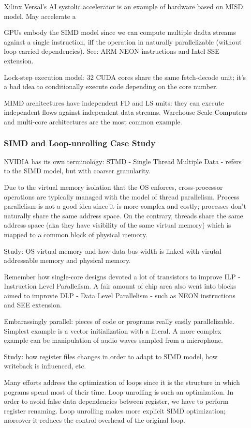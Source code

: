Xilinx Versal's AI systolic accelerator is an example of hardware based on MISD model. May accelerate a 

GPUs embody the SIMD model since we can compute multiple dadta streams against a single instruction, iff the operation in naturally parallelizable (without loop carried dependencies).
See: ARM NEON instructions and Intel SSE extension.

Lock-step execution model: 32 CUDA cores share the same fetch-decode unit; it's a bad idea to conditionally execute code depending on the core number.

MIMD architectures have independent FD and LS units: they can execute independent flows against independent data streams. Warehouse Scale Computers and multi-core architectures are the most common example.

\subsubsection{SIMD and Loop-unrolling Case Study}
NVIDIA has its own terminology: STMD - Single Thread Multiple Data - refers to the SIMD model, but with coarser granularity.

Due to the virtual memory isolation that the OS enforces, cross-processor operations are typically managed with the model of thread parallelism.
Process parallelism is not a good idea since it is more complex and costly; processes don't naturally share the same address space.
On the contrary, threads share the same address space (aka they have visibility of the same virtual memory) which is mapped to a common block of physical memory.

Study: OS virtual memory and how data bus width is linked with virutal addressable memory and physical memory.

Remember how single-core designs devoted a lot of transistors to improve ILP - Instruction Level Parallelism.
A fair amount of chip area also went into blocks aimed to improvie DLP - Data Level Parallelism - such as NEON instructions and SEE extension.

Embarassingly parallel: pieces of code or programs really easily parallelizable. Simplest example is a vector initialization with a literal.
A more complex example can be manipulation of audio waves sampled from a microphone.

Study: how register files changes in order to adapt to SIMD model, how writeback is influenced, etc.

Many efforts address the optimization of loops since it is the structure in which pograms spend most of their time.
Loop unrolling is such an optimization. In order to avoid false data dependencies between register, we have to perform register renaming.
Loop unrolling makes more explicit SIMD optimization; moreover it reduces the control overhead of the original loop.


